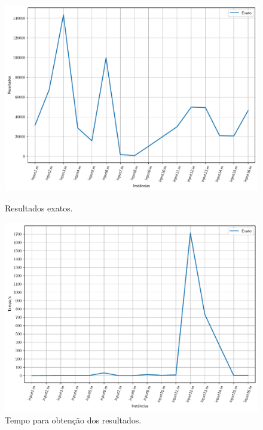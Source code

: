 \documentclass[a4paper, 12pt]{article}
\begin{document}
\begin{figure}[!htb]
    \centering
    \begin{minipage}{0.5\textwidth}
        \centering
        \includegraphics[width=1\linewidth]{../imgs/exact_results.pdf}
        \caption{Resultados exatos.}
        \label{exact_results}
    \end{minipage}%
    \begin{minipage}{0.5\textwidth}
        \centering
        \includegraphics[width=1\linewidth]{../imgs/exact_time.pdf}
        \caption{Tempo para obtenção dos resultados.}
        \label{exact_time}
    \end{minipage}
\end{figure}
\end{document}
